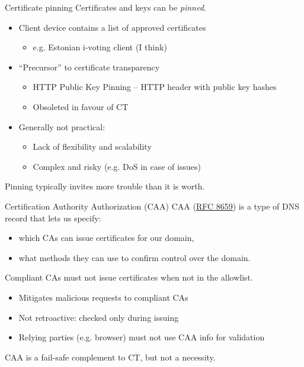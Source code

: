 \begin{frame}{Certificate pinning}
  Certificates and keys can be \emph{pinned}.
  \begin{itemize}[<+(1)->]
    \item Client device contains a list of approved certificates
    \par
    \begin{itemize}
      \item e.g. Estonian i-voting client (I think)
    \end{itemize}
    \item \enquote{Precursor} to certificate transparency
    \par
    \begin{itemize}
      \item HTTP Public Key Pinning -- HTTP header with public key hashes
      \item Obsoleted in favour of CT
    \end{itemize}
    \item Generally not practical:
    \par
    \begin{itemize}
      \item Lack of flexibility and scalability
      \item Complex and risky (e.g. DoS in case of issues)
    \end{itemize}
  \end{itemize}

  \pause
  Pinning typically invites more trouble than it is worth.
\end{frame}

\begin{frame}{Certification Authority Authorization (CAA)}
  CAA (\href{https://datatracker.ietf.org/doc/html/rfc8659}{RFC 8659}) is a type of DNS record that lets us specify:
  \begin{itemize}[<+(1)->]
    \item which CAs can issue certificates for our domain,
    \item what methods they can use to confirm control over the domain.
  \end{itemize}

  \vspace*{0.5em}

  \pause
  Compliant CAs must not issue certificates when not in the allowlist.
  \begin{itemize}[<+(1)->]
    \item Mitigates malicious requests to compliant CAs
    \item Not retroactive: checked only during issuing
    \item Relying parties (e.g. browser) must not use CAA info for validation
  \end{itemize}

  \vspace*{0.5em}

  \pause
  CAA is a fail-safe complement to CT, but not a necessity.
\end{frame}

